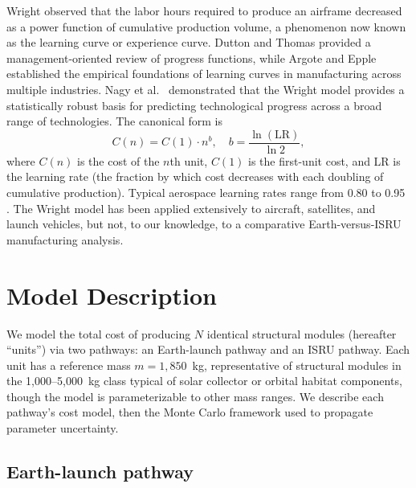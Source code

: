 \documentclass[preprint,12pt]{elsarticle}
\begin{document}
Wright \cite{wright1936} observed that the labor hours required to produce an airframe decreased as a power function of cumulative production volume, a phenomenon now known as the learning curve or experience curve. Dutton and Thomas \cite{dutton1984} provided a management-oriented review of progress functions, while Argote and Epple \cite{argote1990} established the empirical foundations of learning curves in manufacturing across multiple industries. Nagy et al.\ \cite{nagy2013} demonstrated that the Wright model provides a statistically robust basis for predicting technological progress across a broad range of technologies. The canonical form is
\begin{equation}
  C(n) = C(1) \cdot n^{b}, \quad b = \frac{\ln(\text{LR})}{\ln 2},
  \label{eq:wright}
\end{equation}
where $C(n)$ is the cost of the $n$th unit, $C(1)$ is the first-unit cost, and LR is the learning rate (the fraction by which cost decreases with each doubling of cumulative production). Typical aerospace learning rates range from 0.80 to 0.95 \cite{wertz2011}. The Wright model has been applied extensively to aircraft, satellites, and launch vehicles, but not, to our knowledge, to a comparative Earth-versus-ISRU manufacturing analysis.

\section{Model Description}
\label{sec:model}

We model the total cost of producing $N$ identical structural modules (hereafter ``units'') via two pathways: an Earth-launch pathway and an ISRU pathway. Each unit has a reference mass $m = 1{,}850$~kg, representative of structural modules in the 1{,}000--5{,}000~kg class typical of solar collector or orbital habitat components, though the model is parameterizable to other mass ranges. We describe each pathway's cost model, then the Monte Carlo framework used to propagate parameter uncertainty.

\subsection{Earth-launch pathway}
\end{document}
